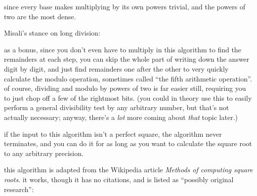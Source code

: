 \documentclass[../footnotes.tex]{subfiles}
\begin{document}
\myfootnote{} since every base makes multiplying by its own powers trivial, and the powers of two are the most dense.

\myfootnote{} Misali's stance on long division: \\

\myfootnote{} as a bonus, since you don't even have to multiply in this algorithm to find the remainders at each step, you can skip the whole part of writing down the answer digit by digit, and just find remainders one after the other to very quickly calculate the modulo operation, sometimes called ``the fifth arithmetic operation''. of course, dividing and modulo by powers of two is far easier still, requiring you to just chop off a few of the rightmost bits. (you could in theory use this to easily perform a general divisibility test by any arbitrary number, but that's not actually necessary; anyway, there's a \emph{lot} more coming about \emph{that} topic later.)

\myfootnote{} if the input to this algorithm isn't a perfect square, the algorithm never terminates, and you can do it for as long as you want to calculate the square root to any arbitrary precision.

\myfootnote{} this algorithm is adapted from the Wikipedia article {\it Methods of computing square roots}. it works, though it has no citations, and is listed as ``possibly original research'': \\
\end{document}
